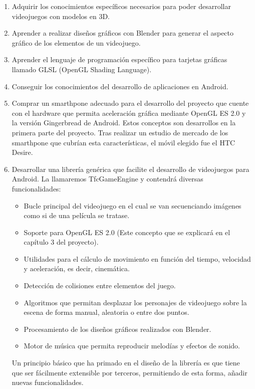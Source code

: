 \begin{enumerate}
\item Adquirir los conocimientos específicos necesarios para poder desarrollar videojuegos con modelos en 3D.
\item Aprender a realizar diseños gráficos con Blender para generar el aspecto gráfico de los elementos de un videojuego.
\item Aprender el lenguaje de programación específico para tarjetas gráficas llamado GLSL (OpenGL Shading Language).
\item Conseguir los conocimientos del desarrollo de aplicaciones en Android.
\item Comprar un smarthpone adecuado para el desarrollo del proyecto que cuente con el hardware que permita aceleración gráfica mediante OpenGL ES 2.0 y la versión Gingerbread de Android. Estos conceptos son desarrollos en la primera parte del proyecto. Tras realizar un estudio de mercado de los smarthpone que cubrían esta características, el móvil elegido fue el HTC Desire.
\item Desarrollar una librería genérica que facilite el desarrollo de videojuegos para Android. La llamaremos TfcGameEngine y contendrá diversas funcionalidades:
	\begin{itemize}
	\item Bucle principal del videojuego en el cual se van secuenciando imágenes como si de una película se tratase.
	\item Soporte para OpenGL ES 2.0 (Este concepto que se explicará en el capítulo 3 del proyecto).
	\item Utilidades para el cálculo de movimiento en función del tiempo, velocidad y aceleración, es decir, cinemática.
	\item Detección de colisiones entre elementos del juego.
	\item Algoritmos que permitan desplazar los personajes de videojuego sobre la escena de forma manual, aleatoria o entre dos puntos.
	\item Procesamiento de los diseños gráficos realizados con Blender.
	\item Motor de música que permita reproducir melodías y efectos de sonido.
	\end{itemize}

	Un principio básico que ha primado en el diseño de la librería es que tiene que ser fácilmente extensible por terceros, permitiendo de esta forma, añadir nuevas funcionalidades. 


\end{enumerate}
